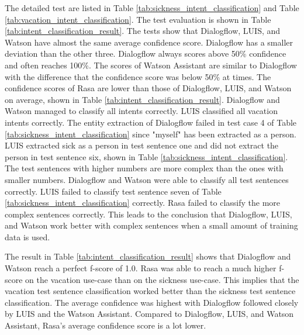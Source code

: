 The detailed test are listed in Table \ref{tab:sickness_intent_classification} and Table \ref{tab:vacation_intent_classification}.
The test evaluation is shown in Table \ref{tab:intent_classification_result}.
The tests show that Dialogflow, LUIS, and Watson have almost the same average confidence score. 
Dialogflow has a smaller deviation than the other three.
Dialogflow always scores above 50\% confidence and often reaches 100\%.
The scores of Watson Assistant are similar to Dialogflow with the difference that the confidence score was below 50\% at times.
The confidence scores of Rasa are lower than those of Dialogflow, LUIS, and Watson on average, shown in Table \ref{tab:intent_classification_result}.
Dialogflow and Watson managed to classify all intents correctly.
LUIS classified all vacation intents correctly.
The entity extraction of Dialogflow failed in test case 4 of Table \ref{tab:sickness_intent_classification} since "myself" has been extracted as a person.
LUIS extracted sick as a person in test sentence one and did not extract the person in test sentence six, shown in Table \ref{tab:sickness_intent_classification}.
The test sentences with higher numbers are more complex than the ones with smaller numbers.
Dialogflow and Watson were able to classify all test sentences correctly.
LUIS failed to classify test sentence seven of Table \ref{tab:sickness_intent_classification} correctly.
Rasa failed to classify the more complex sentences correctly.
This leads to the conclusion that Dialogflow, LUIS, and Watson work better with complex sentences when a small amount of training data is used.

The result in Table \ref{tab:intent_classification_result} shows that 
Dialogflow and Watson reach a perfect f-score of 1.0.
Rasa was able to reach a much higher f-score on the vacation use-case than on the sickness use-case.
This implies that the vacation test sentence classification worked better than the sickness test sentence classification. 
The average confidence was highest with Dialogflow followed 
closely by LUIS and the Watson Assistant.
Compared to Dialogflow, LUIS, and Watson Assistant, Rasa's average confidence score is a lot lower.

